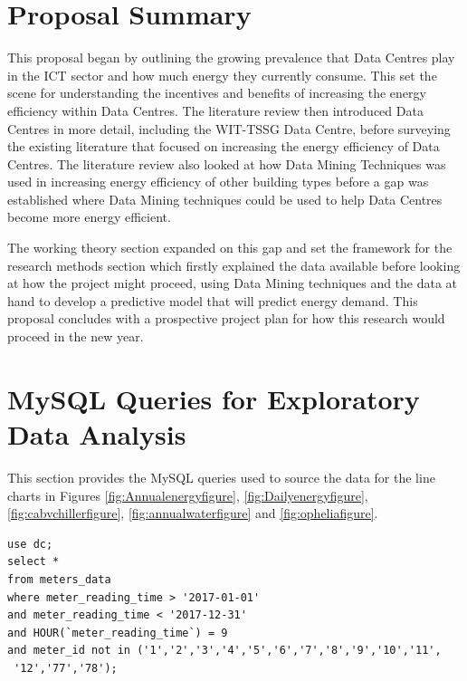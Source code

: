 \documentclass[12pt]{scrartcl}
\begin{document}
\section{Proposal Summary}
\label{sec:[Proposal Summary]}
This proposal began by outlining the growing prevalence that Data Centres play in the ICT sector and how much energy they currently consume. This set the scene for understanding the incentives and benefits of increasing the energy efficiency within Data Centres. The literature review then introduced Data Centres in more detail, including the WIT-TSSG Data Centre, before surveying the existing literature that focused on increasing the energy efficiency of Data Centres.  The literature review also looked at how Data Mining Techniques was used in increasing energy efficiency of other building types before a gap was established where Data Mining techniques could be used to help Data Centres become more energy efficient. 

The working theory section expanded on this gap and set the framework for the research methods section which firstly explained the data available before looking at how the project might proceed, using Data Mining techniques and the data at hand to develop a predictive model that will predict energy demand. This proposal concludes with a prospective project plan for how this research would proceed in the new year.     

\newpage
\printbibliography
\newpage
\appendix
\appendixpage
\addappheadtotoc

\section{MySQL Queries for Exploratory Data Analysis}
\label{sec:[MySQL Queries]}
This section provides the MySQL queries used to source the data for the line charts in Figures \ref{fig:Annualenergyfigure}, \ref{fig:Dailyenergyfigure}, \ref{fig:cabvchillerfigure}, \ref{fig:annualwaterfigure} and \ref{fig:opheliafigure}.

\begin{lstlisting}[frame=single,basicstyle=\footnotesize\ttfamily,
  caption={Annual Energy Consumption},label={list:[Annual Energy Consumption]}]
use dc; 
select * 
from meters_data
where meter_reading_time > '2017-01-01'
and meter_reading_time < '2017-12-31'
and HOUR(`meter_reading_time`) = 9
and meter_id not in ('1','2','3','4','5','6','7','8','9','10','11',
 '12','77','78');
\end{lstlisting}
\end{document}
